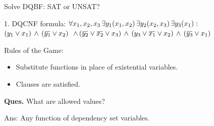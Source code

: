 \documentclass[xcolor=table	]{beamer}
\newcommand{\ov}[1]{\mkern 1.5mu\overline{\mkern-1.5mu#1\mkern-1.5mu}\mkern 1.5mu}
\begin{document}
\begin{frame}{Solve DQBF: SAT or UNSAT?}


\begin{alertblock}{1. DQCNF formula:}
	{
		$\forall x_1,x_2,x_3 \, \exists y_1(x_1,x_2) \, \exists y_2(x_2,x_3) \, \exists y_3(x_1) : \newline$
		$(y_{1} \vee x_1) \, \wedge \, (\ov{y_1} \vee x_2)  \newline$ 
		$ \, \wedge \, (\ov{y_2} \vee \ov{x_2} \vee x_3)  \newline \, \wedge \, (y_3 \vee \ov{x_1} \vee x_2) \, \wedge \, (\ov{y_3} \vee x_1)$
		\vspace{0.2cm}
	}
\end{alertblock}
\pause

Rules of the Game: \\

\begin{itemize}
	\pause
	
	\item Substitute functions in place of existential variables.
	\pause
	
	\item Clauses are satisfied.
\end{itemize}
\pause
 
\textbf{Ques.} What are allowed values? \\
\pause

Ans: Any function of dependency set variables.
\end{frame}
\end{document}
